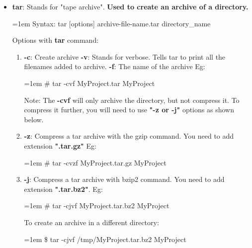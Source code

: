 \begin{flushleft}
\begin{itemize}
		\item \textbf{tar}: Stands for "tape archive". \textbf{Used to create an archive of a directory.}
		\begin{tcolorbox}[breakable,notitle,boxrule=0pt,colback=pink,colframe=pink]
			\color{black}
			\font=1em
			Syntax: tar [options] archive-file-name.tar directory\_name
			\font=4pt
		\end{tcolorbox}
		Options with \textbf{tar} command:
		\begin{enumerate}
			\item \textbf{-c}: Create archive
			\newline
			\textbf{-v}: Stands for verbose. Tells tar to print all the filenames added to archive.
			\newline
			\textbf{-f}: The name of the archive
			Eg:
			\begin{tcolorbox}[breakable,notitle,boxrule=-0pt,colback=black,colframe=black]
				\color{green}
				\font=1em
				\# tar -cvf MyProject.tar  MyProject
				\font=4pt
			\end{tcolorbox}		
			\bigskip
			\begin{tcolorbox}[breakable,notitle,boxrule=0pt,colback=yellow,colframe=yellow]
				\color{black}
				Note: The \textbf{-cvf} will only archive the directory, but not compress it. To compress it further, you will need to use \textbf{"-z or -j"} options as shown below.
			\end{tcolorbox}
			\item \textbf{-z}: Compress a tar archive with the gzip command. You need to add extension \textbf{".tar.gz"}
			\newline
			Eg:
			\begin{tcolorbox}[breakable,notitle,boxrule=-0pt,colback=black,colframe=black]
				\color{green}
				\font=1em
				\# tar -cvzf MyProject.tar.gz  MyProject
				\font=4pt
			\end{tcolorbox}		
			\item \textbf{-j}: Compress a tar archive with bzip2 command. You need to add extension \textbf{".tar.bz2"}.
			\newline
			Eg:
			\begin{tcolorbox}[breakable,notitle,boxrule=-0pt,colback=black,colframe=black]
				\color{green}
				\font=1em
				\# tar -cjvf MyProject.tar.bz2  MyProject
				\font=4pt
			\end{tcolorbox}		
		
			To create an archive in a different directory:
			\begin{tcolorbox}[breakable,notitle,boxrule=-0pt,colback=black,colframe=black]
				\color{green}
				\font=1em
				\$ tar -cjvf /tmp/MyProject.tar.bz2  MyProject
				\font=4pt
			\end{tcolorbox}		
		

\end{enumerate}
\end{itemize}
\end{flushleft}

